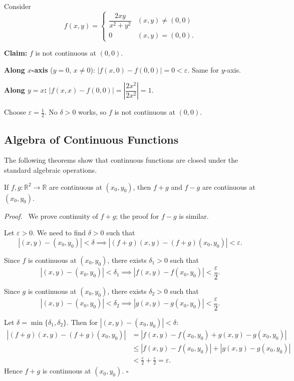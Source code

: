 \documentclass[11pt]{report}
\renewenvironment{proof}[1][Proof]{\par\noindent\textit{#1.}\ }{\hfill$\square$\par\medskip}
\newcommand{\R}{\mathbb{R}}
\newcommand{\eps}{\varepsilon}
\begin{document}
\begin{example}
Consider
\[
f(x, y) = \begin{cases} \dfrac{2xy}{x^2 + y^2} & (x, y) \neq (0,0) \\[6pt] 0 & (x, y) = (0, 0). \end{cases}
\]

\textbf{Claim:} $f$ is not continuous at $(0, 0)$.

\textbf{Along $x$-axis} ($y = 0$, $x \neq 0$): $|f(x, 0) - f(0, 0)| = 0 < \eps$. Same for $y$-axis.

\textbf{Along $y = x$:} $|f(x, x) - f(0, 0)| = \left|\dfrac{2x^2}{2x^2}\right| = 1$.

Choose $\eps = \tfrac{1}{2}$. No $\delta > 0$ works, so $f$ is not continuous at $(0, 0)$.
\end{example}

\subsection{Algebra of Continuous Functions}

The following theorems show that continuous functions are closed under the standard algebraic operations.

\begin{theorem}
If $f, g : \R^2 \to \R$ are continuous at $(x_0, y_0)$, then $f + g$ and $f - g$ are continuous at $(x_0, y_0)$.
\end{theorem}

\begin{proof}
We prove continuity of $f + g$; the proof for $f - g$ is similar.

Let $\varepsilon > 0$. We need to find $\delta > 0$ such that
\[
|(x, y) - (x_0, y_0)| < \delta \implies |(f + g)(x, y) - (f + g)(x_0, y_0)| < \varepsilon.
\]

Since $f$ is continuous at $(x_0, y_0)$, there exists $\delta_1 > 0$ such that
\[
|(x, y) - (x_0, y_0)| < \delta_1 \implies |f(x, y) - f(x_0, y_0)| < \frac{\varepsilon}{2}.
\]

Since $g$ is continuous at $(x_0, y_0)$, there exists $\delta_2 > 0$ such that
\[
|(x, y) - (x_0, y_0)| < \delta_2 \implies |g(x, y) - g(x_0, y_0)| < \frac{\varepsilon}{2}.
\]

Let $\delta = \min\{\delta_1, \delta_2\}$. Then for $|(x, y) - (x_0, y_0)| < \delta$:
\begin{align*}
|(f + g)(x, y) - (f + g)(x_0, y_0)| &= |f(x, y) - f(x_0, y_0) + g(x, y) - g(x_0, y_0)| \\
&\leq |f(x, y) - f(x_0, y_0)| + |g(x, y) - g(x_0, y_0)| \\
&< \frac{\varepsilon}{2} + \frac{\varepsilon}{2} = \varepsilon.
\end{align*}
Hence $f + g$ is continuous at $(x_0, y_0)$.
\end{proof}
\end{document}
